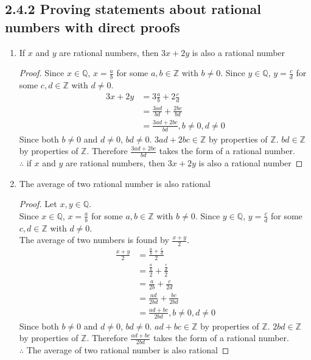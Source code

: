 \documentclass{article}
\newcommand{\bld}{\textbf}
\newcommand{\bb}{\mathbb}
\newcommand{\bitem}[1]{\item[\bld{#1.}]}
\begin{document}
\subsection*{2.4.2 Proving statements about rational numbers with direct proofs}
\begin{enumerate}
  \bitem{c} If $x$ and $y$ are rational numbers, then $3x + 2y$ is also a rational number
  \begin{proof}
    Since $x \in \bb{Q}$, $x = \frac{a}{b}$ for some $a,b \in \bb{Z}$ with $b \neq 0$.
    Since $y \in \bb{Q}$, $y = \frac{c}{d}$ for some $c,d \in \bb{Z}$ with $d \neq 0$.
    \begin{align*}
      3x + 2y & = 3\frac{a}{b} + 2\frac{c}{d}              \\
              & = \frac{3ad}{bd} + \frac{2bc}{bd}          \\
              & = \frac{3ad + 2bc}{bd}, b \neq 0, d \neq 0
    \end{align*}
    Since both $b \neq 0$ and $d \neq 0$, $bd \neq 0$. $3ad + 2bc \in \bb{Z}$ by properties of $\bb{Z}$.
    $bd \in \bb{Z}$ by properties of $\bb{Z}$. Therefore $\frac{3ad + 2bc}{bd}$ takes the form of a rational number. \\
    $\therefore$ if $x$ and $y$ are rational numbers, then $3x + 2y$ is also a rational number
  \end{proof}
  \bitem{f} The average of two rational number is also rational
  \begin{proof}
    Let $x,y \in \bb{Q}$. \\
    Since $x \in \bb{Q}$, $x = \frac{a}{b}$ for some $a,b \in \bb{Z}$ with $b \neq 0$.
    Since $y \in \bb{Q}$, $y = \frac{c}{d}$ for some $c,d \in \bb{Z}$ with $d \neq 0$. \\
    The average of two numbers is found by $\frac{x + y}{2}$.
    \begin{align*}
      \frac{x+y}{2} & = \frac{\frac{a}{b} + \frac{c}{d}}{2}           \\
                    & = \frac{\frac{a}{b}}{2} + \frac{\frac{c}{d}}{2} \\
                    & = \frac{a}{2b} + \frac{c}{2d}                   \\
                    & = \frac{ad}{2bd} + \frac{bc}{2bd}               \\
                    & = \frac{ad + bc}{2bd}, b \neq 0, d \neq 0
    \end{align*}
    Since both $b \neq 0$ and $d \neq 0$, $bd \neq 0$. $ad + bc \in \bb{Z}$ by properties of $\bb{Z}$.
    $2bd \in \bb{Z}$ by properties of $\bb{Z}$. Therefore $\frac{ad + bc}{2bd}$ takes the form of a rational number. \\
    $\therefore$ The average of two rational number is also rational
  \end{proof}
\end{enumerate}
\end{document}
